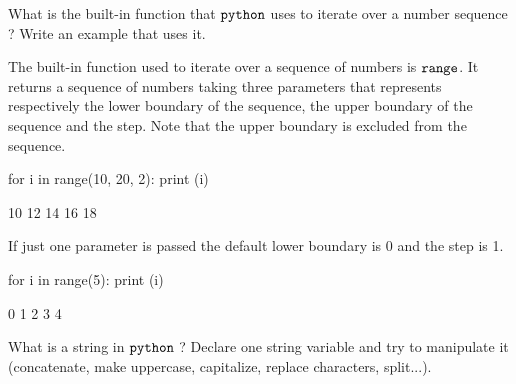 \begin{question}
What is the built-in function that \(\tt{python}\) uses to iterate over a number sequence ? Write an example that uses it.
\end{question}

\cprotEnv \begin{solution}
The built-in function used to iterate over a sequence of numbers is \(\tt{range}\). It returns a sequence of numbers taking three parameters that represents respectively the lower boundary of the sequence, the upper boundary of the sequence and the step. Note that the upper boundary is excluded from the sequence.

\begin{ipython}
for i in range(10, 20, 2):
    print (i)
\end{ipython}
\begin{ioutput}
10
12
14
16
18
\end{ioutput}
If just one parameter is passed the default lower boundary is 0 and the step is 1. 
\begin{ipython}
for i in range(5):
    print (i)
\end{ipython}
\begin{ioutput}    
0
1
2
3
4
\end{ioutput}
\end{solution}

\begin{question}
What is a string in \(\tt{python}\) ? Declare one string variable and try to manipulate it (concatenate, make uppercase, capitalize, replace characters, split...).
\end{question}

